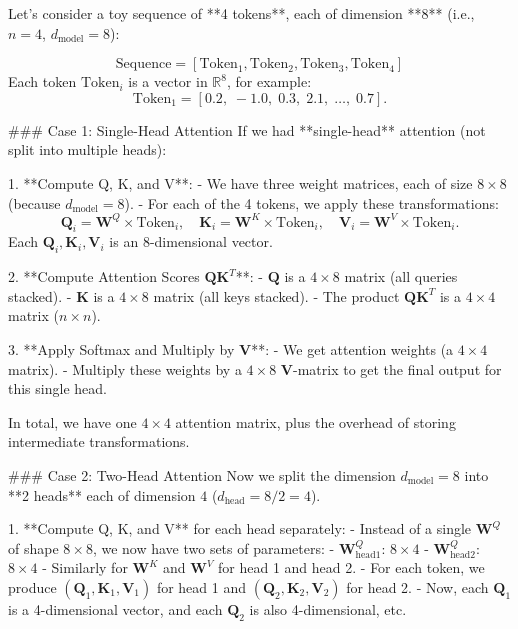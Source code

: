 Let’s consider a toy sequence of **4 tokens**, each of dimension **8** (i.e., \(n = 4\), \(d_{\text{model}} = 8\)):

\[
\text{Sequence} = [\text{Token}_1, \text{Token}_2, \text{Token}_3, \text{Token}_4]
\]
Each token \(\text{Token}_i\) is a vector in \(\mathbb{R}^8\), for example:  
\[
\text{Token}_1 = [0.2,\; -1.0,\; 0.3,\; 2.1,\; \ldots,\; 0.7].
\]

### Case 1: Single-Head Attention
If we had **single-head** attention (not split into multiple heads):

1. **Compute Q, K, and V**:  
   - We have three weight matrices, each of size \(8 \times 8\) (because \(d_{\text{model}} = 8\)).  
   - For each of the 4 tokens, we apply these transformations:
     \[
     \mathbf{Q}_i = \mathbf{W}^Q \times \text{Token}_i, \quad
     \mathbf{K}_i = \mathbf{W}^K \times \text{Token}_i, \quad
     \mathbf{V}_i = \mathbf{W}^V \times \text{Token}_i.
     \]
     Each \(\mathbf{Q}_i, \mathbf{K}_i, \mathbf{V}_i\) is an 8-dimensional vector.

2. **Compute Attention Scores \(\mathbf{Q}\mathbf{K}^T\)**:  
   - \(\mathbf{Q}\) is a \(4 \times 8\) matrix (all queries stacked).  
   - \(\mathbf{K}\) is a \(4 \times 8\) matrix (all keys stacked).  
   - The product \(\mathbf{Q} \mathbf{K}^T\) is a \(4 \times 4\) matrix (\(n \times n\)).  

3. **Apply Softmax and Multiply by \(\mathbf{V}\)**:  
   - We get attention weights (a \(4 \times 4\) matrix).  
   - Multiply these weights by a \(4 \times 8\) \(\mathbf{V}\)-matrix to get the final output for this single head.

In total, we have one \(4 \times 4\) attention matrix, plus the overhead of storing intermediate transformations.

### Case 2: Two-Head Attention
Now we split the dimension \(d_{\text{model}}=8\) into **2 heads** each of dimension \(4\) (\(d_{\text{head}} = 8/2 = 4\)).

1. **Compute Q, K, and V** for each head separately:  
   - Instead of a single \(\mathbf{W}^Q\) of shape \(8 \times 8\), we now have two sets of parameters:  
     - \(\mathbf{W}^Q_{\text{head1}}\): \(8 \times 4\)  
     - \(\mathbf{W}^Q_{\text{head2}}\): \(8 \times 4\)  
   - Similarly for \(\mathbf{W}^K\) and \(\mathbf{W}^V\) for head 1 and head 2.  
   - For each token, we produce \((\mathbf{Q}_1, \mathbf{K}_1, \mathbf{V}_1)\) for head 1 and \((\mathbf{Q}_2, \mathbf{K}_2, \mathbf{V}_2)\) for head 2.  
   - Now, each \(\mathbf{Q}_1\) is a 4-dimensional vector, and each \(\mathbf{Q}_2\) is also 4-dimensional, etc.

